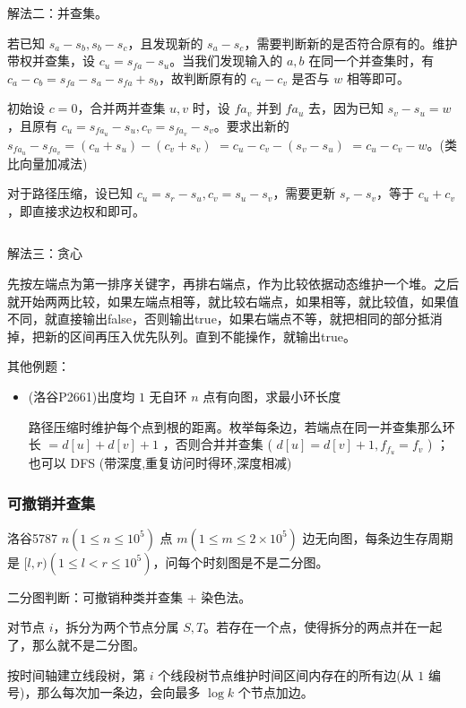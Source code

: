 \documentclass[twocolumn,10pt]{ctexart}
\begin{document}
解法二：并查集。

若已知 $s_a-s_b,s_b-s_c$，且发现新的 $s_a-s_c$，需要判断新的是否符合原有的。维护带权并查集，设 $c_u=s_{fa}-s_u$。当我们发现输入的 $a,b$ 在同一个并查集时，有 $c_a-c_b=s_{fa}-s_a-s_{fa}+s_b$，故判断原有的 $c_u-c_v$ 是否与 $w$ 相等即可。

初始设 $c=0$，合并两并查集 $u,v$ 时，设 $fa_v$ 并到 $fa_u$ 去，因为已知 $s_v-s_u=w$，且原有 $c_u=s_{fa_u}-s_u,\allowbreak{}c_v=s_{fa_v}-s_v$。要求出新的 $s_{fa_u}-s_{fa_v}=(c_u+s_u)-(c_v+s_v)$ $=c_u-c_v-(s_v-s_u)$ $=c_u-c_v-w$。(类比向量加减法)

对于路径压缩，设已知 $c_u=s_r-s_u,c_v=s_u-s_v$，需要更新 $s_r-s_v$，等于 $c_u+c_v$，即直接求边权和即可。

\inputminted{cpp}{code/p2294_disjoint_set.cpp}

解法三：贪心

先按左端点为第一排序关键字，再排右端点，作为比较依据动态维护一个堆。之后就开始两两比较，如果左端点相等，就比较右端点，如果相等，就比较值，如果值不同，就直接输出false，否则输出true，如果右端点不等，就把相同的部分抵消掉，把新的区间再压入优先队列。直到不能操作，就输出true。

其他例题：

\begin{itemize}
\item (洛谷P2661)出度均 $1$ 无自环 $n$ 点有向图，求最小环长度

路径压缩时维护每个点到根的距离。枚举每条边，若端点在同一并查集那么环长 $=d[u]+d[v]+1$ ，否则合并并查集 ( $d[u]=d[v]+1,f_{f_u}=f_v$ ) ；也可以 DFS (带深度,重复访问时得环,深度相减)
\end{itemize}

\subsubsection{可撤销并查集}

\begin{notebox}
洛谷5787 $n(1\le n\le10^5)$ 点 $m(1\le m\le2\times10^5)$ 边无向图，每条边生存周期是 $[l,r)(1\le l < r\le10^5)$，问每个时刻图是不是二分图。
\end{notebox}

二分图判断：可撤销种类并查集 + 染色法。

对节点 $i$，拆分为两个节点分属 $S,T$。若存在一个点，使得拆分的两点并在一起了，那么就不是二分图。

按时间轴建立线段树，第 $i$ 个线段树节点维护时间区间内存在的所有边(从 $1$ 编号)，那么每次加一条边，会向最多 $\log k$ 个节点加边。
\end{document}
